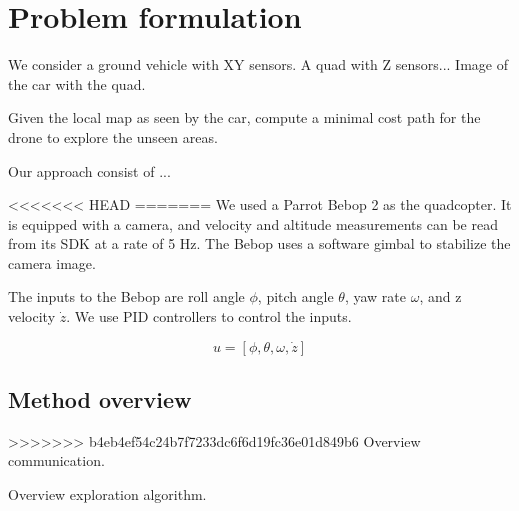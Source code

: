 
\section{Problem formulation}

We consider a ground vehicle with XY sensors. 
A quad with Z sensors...
Image of the car with the quad.

\begin{problem}
Given the local map as seen by the car, compute a minimal cost path for the drone to explore the unseen areas.
\end{problem}

Our approach consist of ...

<<<<<<< HEAD
=======
We used a Parrot Bebop 2 as the quadcopter. It is equipped with a camera,
and velocity and altitude measurements can be read from its SDK at a rate of
5 Hz. The Bebop uses a software gimbal to stabilize the camera image.

The inputs to the Bebop are roll angle $\phi$, pitch angle $\theta$, 
yaw rate $\omega$, and z velocity $\dot{z}$. We use
PID controllers to control the inputs.

$$ u = [\phi, \theta, \omega, \dot{z}] $$

\subsection{Method overview}
>>>>>>> b4eb4ef54c24b7f7233dc6f6d19fc36e01d849b6
Overview communication.

Overview exploration algorithm.